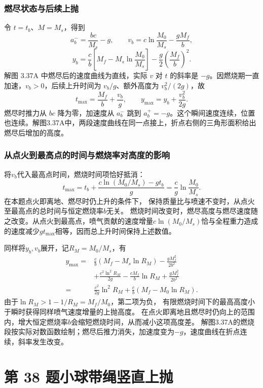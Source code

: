 \documentclass[UTF8,fontset=fandol,a4paper,11pt]{ctexart}
\begin{document}
\subsubsection*{燃尽状态与后续上抛}
令 $t=t_b$、$M=M_s$，得到
\[
a_b^-=\frac{bc}{M_s}-g,\qquad
v_b=c\ln\frac{M_0}{M_s}-\frac{gM_f}{b},
\]
\[
y_b=\frac cb\left[M_f-M_s\ln\frac{M_0}{M_s}\right]
-\frac g2\left(\frac{M_f}{b}\right)^2.
\]
解图 3.37A 中燃尽后的速度曲线为直线，实际 $v$ 对 $t$ 的斜率是 $-g$。因燃烧期一直加速，$v_b>0$，后续上升时间为 $v_b/g$、额外高度为 $v_b^2/(2g)$，故
\[
\boxed{t_{\max}=\frac{M_f}{b}+\frac{v_b}{g}},\qquad
\boxed{y_{\max}=y_b+\frac{v_b^2}{2g}}.
\]
燃尽时推力从 $bc$ 降为零，加速度从 $a_b^-$ 跳到 $a_b^+=-g$。这个瞬间速度连续，位置也连续。解图3.37A中，两段速度曲线在同一点接上，折点右侧的三角形面积给出燃尽后增加的高度。
\subsubsection*{从点火到最高点的时间与燃烧率对高度的影响}
将$v_b$代入最高点时间，燃烧时间项恰好抵消：
\[
t_{\max}=t_b+\frac{c\ln(M_0/M_s)-gt_b}{g}
=\boxed{\frac cg\ln\frac{M_0}{M_s}}.
\]
在本题点火即离地、燃尽时仍上升的条件下，
保持质量比与喷速不变时，从点火至最高点的总时间与恒定燃烧率$b$无关。
燃烧时间改变时，燃尽高度与燃尽速度随之改变。从点火到最高点，喷气贡献的速度增量$c\ln(M_0/M_s)$恰与全程重力造成的速度减少$gt_{\max}$相等，因而总上升时间保持上述数值。

同样将$y_b,v_b$展开，记$R_M=M_0/M_s$，有
\[
\begin{aligned}
y_{\max}
={}&\frac cb(M_f-M_s\ln R_M)-\frac{gM_f^2}{2b^2}\\
&+\frac{c^2\ln^2R_M}{2g}-\frac{cM_f}{b}\ln R_M
+\frac{gM_f^2}{2b^2}\\
={}&\boxed{\frac{c^2}{2g}\ln^2R_M
+\frac cb(M_f-M_0\ln R_M)}.
\end{aligned}
\]
由于$\ln R_M>1-1/R_M=M_f/M_0$，第二项为负，
有限燃烧时间下的最高高度小于瞬时获得同样喷气速度增量的上抛高度。
在点火即离地且燃尽时仍向上的范围内，增大恒定燃烧率$b$会缩短燃烧时间，从而减小这项高度差。
解图3.37A的燃烧段按实际对数函数绘制；燃尽后推力消失，加速度变为$-g$，速度曲线在折点连续，斜率发生改变。




\section*{第 38 题\quad 小球带绳竖直上抛}
\end{document}
